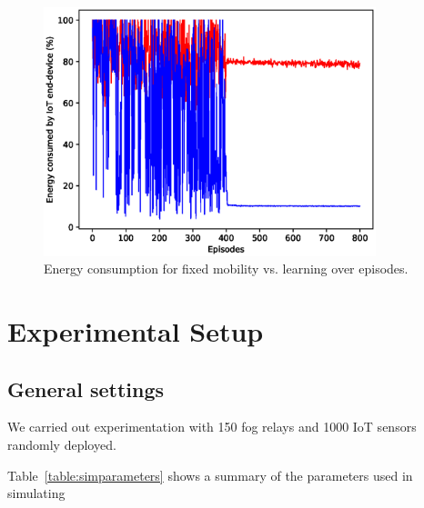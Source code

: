 \documentclass[journal]{IEEEtran}
\begin{document}
\begin{figure}[!t]
\centering
\includegraphics[width=3.8in]{fixed_mob.eps}
\caption{Energy consumption for fixed mobility vs. learning over episodes.}
\label{fixed_mob}
\end{figure}


\section{Experimental Setup}

\subsection{General settings}
We carried out experimentation with 150 fog relays and 1000 IoT sensors randomly deployed.




Table~\ref{table:simparameters} shows a summary of the parameters used in simulating
\end{document}
